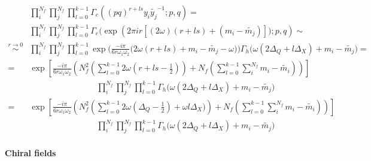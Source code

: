 \begin{appendices}
\begin{equation}
\begin{aligned}
&\prod_i^{N_f} \prod_j^{N_f}  \prod_{l=0}^{k-1} \Gamma_e ( (pq)^{r + l s} y_i \tilde{y_j}^{-1}; p ,q)  = \\
& \prod_i^{N_f} \prod_j^{N_f}  \prod_{l=0}^{k-1} \Gamma_e \big ( \exp \left( 2 \pi i r \left[ (2 \omega)(r + l s) +  ( m_i - \tilde{m_j})\right]); p ,q \right)  \sim \\
\overset{ r\rightarrow 0 }{ \sim } &  \prod_i^{N_f} \prod_j^{N_f}  \prod_{l=0}^{k-1} \exp \bigg( \frac{- i \pi }{6 r \omega_1 \omega_2} \big( 2 \omega ( r + l s ) + m_i - \tilde{m_j} - \omega \big) \bigg) \Gamma_h \big( \omega ( 2 \Delta_Q + l \Delta_X) + m_i - \tilde{m_j} \big)   = \\
= &  \exp \left[ \frac{- i \pi }{6 r \omega_1 \omega_2} \left(  N_f^2  \left( \sum _{l=0}^{k-1} 2 \omega ( r + l s - \frac{1}{2}  )\right)  +N_f \left( \sum_{l=0}^{k-1} \sum_i^{N_f} m_i - \tilde{m_i}\right) \right) \right] \\
& \qquad \qquad\qquad \qquad  \prod_i^{N_f} \prod_j^{N_f}  \prod_{l=0}^{k-1}  \Gamma_h \big( \omega ( 2 \Delta_Q + l  \Delta_X) + m_i -  \tilde{m_j} \big)  \\
= &  \exp \left[ \frac{- i \pi }{6 r \omega_1 \omega_2} \left(  N_f^2  \left( \sum _{l=0}^{k-1} 2 \omega ( \Delta_Q - \frac{1}{2}) + \omega l \Delta_X   )\right)  +N_f \left( \sum_{l=0}^{k-1} \sum_i^{N_f} m_i - \tilde{m_i}\right) \right) \right] \\
&\qquad \qquad \qquad \qquad \prod_i^{N_f} \prod_j^{N_f}  \prod_{l=0}^{k-1}  \Gamma_h \big( \omega ( 2 \Delta_Q + l \Delta_X) + m_i - \tilde{m_j} \big)
\end{aligned}
\end{equation}

\paragraph{Chiral fields}



\end{appendices}

